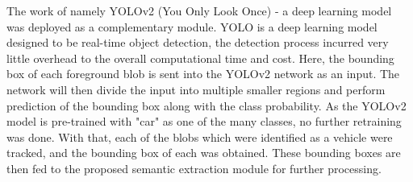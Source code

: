 The work of \cite{redmon2016you} namely YOLOv2 (You Only Look Once) - a deep learning model was deployed as a complementary module. YOLO is a deep learning model designed to be real-time object detection, the detection process incurred very little overhead to the overall computational time and cost. Here, the bounding box of each foreground blob is sent into the YOLOv2 network as an input. The network will then divide the input into multiple smaller regions and perform prediction of the bounding box along with the class probability. As the YOLOv2 model is pre-trained with "car" as one of the many classes, no further retraining was done. With that, each of the blobs which were identified as a vehicle were tracked, and the bounding box of each was obtained. These bounding boxes are then fed to the proposed semantic extraction module for further processing.  





